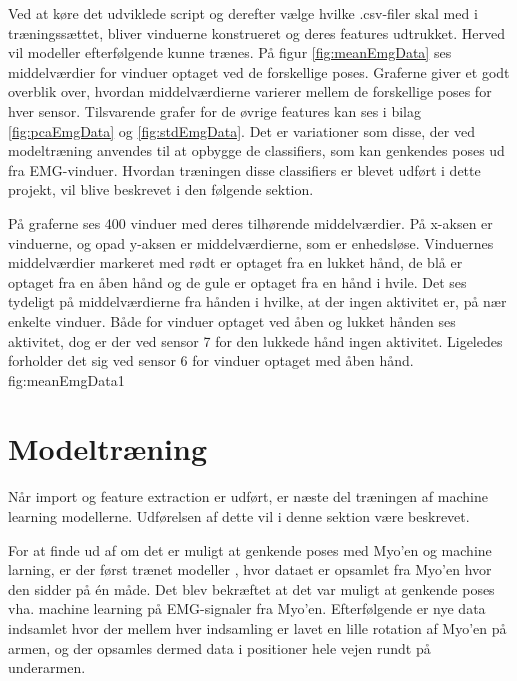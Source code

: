 Ved at køre det udviklede script og derefter vælge hvilke .csv-filer skal med i træningssættet, bliver vinduerne konstrueret og deres features udtrukket. Herved vil modeller efterfølgende kunne trænes. På figur \ref{fig:meanEmgData} ses middelværdier for vinduer optaget ved de forskellige poses. Graferne giver et godt overblik over, hvordan middelværdierne varierer mellem de forskellige poses for hver sensor. Tilsvarende grafer for de øvrige features kan ses i bilag \ref{fig:pcaEmgData} og \ref{fig:stdEmgData}. Det er variationer som disse, der ved modeltræning anvendes til at opbygge de classifiers, som kan genkendes poses ud fra EMG-vinduer. Hvordan træningen disse classifiers er blevet udført i dette projekt, vil blive beskrevet i den følgende sektion.

{
	På graferne ses 400 vinduer med deres tilhørende middelværdier. På x-aksen er vinduerne, og opad y-aksen er middelværdierne, som er enhedsløse. Vinduernes middelværdier markeret med rødt er optaget fra en lukket hånd, de blå er optaget fra en åben hånd og de gule er optaget fra en hånd i hvile. Det ses tydeligt på middelværdierne fra hånden i hvilke, at der ingen aktivitet er, på nær enkelte vinduer. Både for vinduer optaget ved åben og lukket hånden ses aktivitet, dog er der ved sensor 7 for den lukkede hånd ingen aktivitet. Ligeledes forholder det sig ved sensor 6 for vinduer optaget med åben hånd.
 }{fig:meanEmgData}{1}

\section{Modeltræning}
Når import og feature extraction er udført, er næste del træningen af machine learning modellerne. Udførelsen af dette vil i denne sektion være beskrevet.


For at finde ud af om det er muligt at genkende poses med Myo'en og machine larning, er der først trænet modeller , hvor dataet er opsamlet fra Myo'en hvor den sidder på én måde. Det blev bekræftet at det var muligt at genkende poses vha. machine learning på EMG-signaler fra Myo'en. Efterfølgende er nye data indsamlet hvor der mellem hver indsamling er lavet en lille rotation af Myo'en på armen, og der opsamles dermed data i positioner hele vejen rundt på underarmen.

